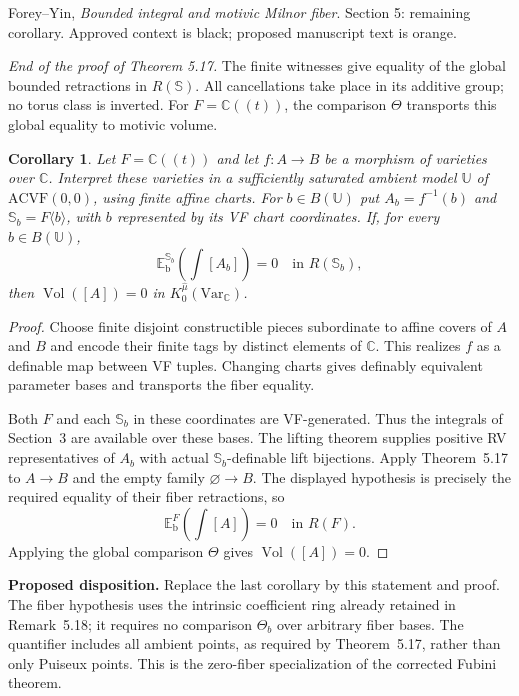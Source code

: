 \documentclass[12pt]{amsart}
\theoremstyle{remark}
\theoremstyle{definition}
\newcommand{\C}{\mathds{C}}
\newcommand{\Sbase}{\mathbb S}
\numberwithin{equation}{section}
\newcommand{\Var}{\mathrm{Var}}
\newcommand{\Kmon}{K_0^{\widehat\mu}(\Var_{\C})}
\newcommand{\Vol}{\operatorname{Vol}}
\theoremstyle{plain}
\newcommand{\Sfiber}{\mathbb S_b}
\theoremstyle{plain}
\theoremstyle{plain}
\newtheorem{cor}[thm]{Corollary}
\begin{document}
\setcounter{section}{5}
\setcounter{thm}{20}
{\small\noindent Forey--Yin, \emph{Bounded integral and motivic Milnor fiber}.
Section 5: remaining corollary.
Approved context is black; proposed manuscript text is orange.}
\medskip

\noindent\emph{End of the proof of Theorem 5.17.}
The finite witnesses give equality of the global bounded
retractions in $R(\Sbase)$.
All cancellations take place in its additive group;
no torus class is inverted.
For $F=\C((t))$, the comparison $\Theta$ transports this
global equality to motivic volume.

{\color{ProposalOrange}
\begin{cor}\label{cor:global:vanishing}
Let $F=\C((t))$ and let $f:A\to B$ be a morphism of
varieties over $\C$.
Interpret these varieties in a sufficiently saturated
ambient model $\mathbb U$ of $\mathrm{ACVF}(0,0)$, using
finite affine charts.
For $b\in B(\mathbb U)$ put $A_b=f^{-1}(b)$ and
$\Sfiber=F\langle b\rangle$, with $b$ represented by its
VF chart coordinates.
If, for every $b\in B(\mathbb U)$,
\[
 \mathbb E_{\mathrm b}^{\Sfiber}\!
       \left(\int[A_b]\right)=0
       \quad\text{in }R(\Sfiber),
\]
then $\Vol([A])=0$ in $\Kmon$.
\end{cor}

\begin{proof}
Choose finite disjoint constructible pieces subordinate to
affine covers of $A$ and $B$ and encode their finite tags
by distinct elements of $\C$.
This realizes $f$ as a definable map between VF tuples.
Changing charts gives definably equivalent parameter
bases and transports the fiber equality.

Both $F$ and each $\Sfiber$ in these coordinates are
VF-generated. Thus the integrals of Section~3 are
available over these bases.
The lifting theorem supplies positive RV representatives
of $A_b$ with actual $\Sfiber$-definable lift bijections.
Apply Theorem~5.17 to $A\to B$ and the empty family
$\varnothing\to B$.
The displayed hypothesis is precisely the required
equality of their fiber retractions, so
\[
 \mathbb E_{\mathrm b}^{F}\!
       \left(\int[A]\right)=0
       \quad\text{in }R(F).
\]
Applying the global comparison $\Theta$ gives
$\Vol([A])=0$.
\end{proof}
}

\medskip
{\small\noindent\color{ProposalOrange}
\textbf{Proposed disposition.}
Replace the last corollary by this statement and proof.
The fiber hypothesis uses the intrinsic coefficient ring
already retained in Remark~5.18; it requires no comparison
$\Theta_b$ over arbitrary fiber bases.
The quantifier includes all ambient points, as required
by Theorem~5.17, rather than only Puiseux points.
This is the zero-fiber specialization of the corrected
Fubini theorem.}
\end{document}
